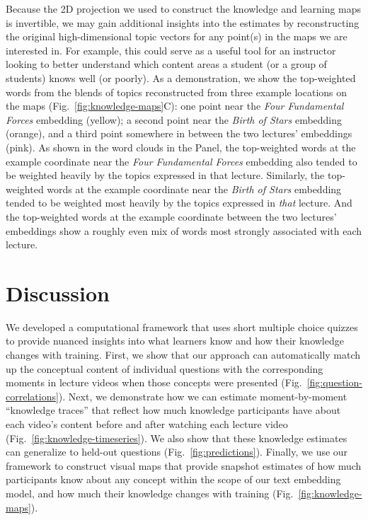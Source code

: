 \documentclass[10pt]{article}
\begin{document}
Because the 2D projection we used to construct the knowledge and learning maps
is invertible, we may gain additional insights into the estimates
by reconstructing the original high-dimensional topic vectors for any point(s)
in the maps we are interested in. For example, this could serve as a useful
tool for an instructor looking to better understand which content areas a
student (or a group of students) knows well (or poorly). As a demonstration, we
show the top-weighted words from the blends of topics reconstructed from three
example locations on the maps (Fig.~\ref{fig:knowledge-maps}C): one point near
the \textit{Four Fundamental Forces} embedding (yellow); a second point near
the \textit{Birth of Stars} embedding (orange), and a third point somewhere in
between the two lectures' embeddings (pink). As shown in the word clouds in the
Panel, the top-weighted words at the example coordinate near the \textit{Four
Fundamental Forces} embedding also tended to be weighted heavily by the topics
expressed in that lecture. Similarly, the top-weighted words at the example
coordinate near the \textit{Birth of Stars} embedding tended to be weighted
most heavily by the topics expressed in \textit{that} lecture. And the
top-weighted words at the example coordinate between the two lectures'
embeddings show a roughly even mix of words most strongly associated with each
lecture.

\section*{Discussion}

We developed a computational framework that uses short multiple choice quizzes
to provide nuanced insights into what learners know and how their knowledge
changes with training. First, we show that our approach can automatically match
up the conceptual content of individual questions with the corresponding
moments in lecture videos when those concepts were presented
(Fig.~\ref{fig:question-correlations}). Next, we demonstrate how we can
estimate moment-by-moment ``knowledge traces'' that reflect how much knowledge
participants have about each video's content before and after watching each
lecture video (Fig.~\ref{fig:knowledge-timeseries}). We also show that these
knowledge estimates can generalize to held-out questions
(Fig.~\ref{fig:predictions}). Finally, we use our framework to construct visual
maps that provide snapshot estimates of how much participants know about any
concept within the scope of our text embedding model, and how much their
knowledge changes with training (Fig.~\ref{fig:knowledge-maps}).
\end{document}
